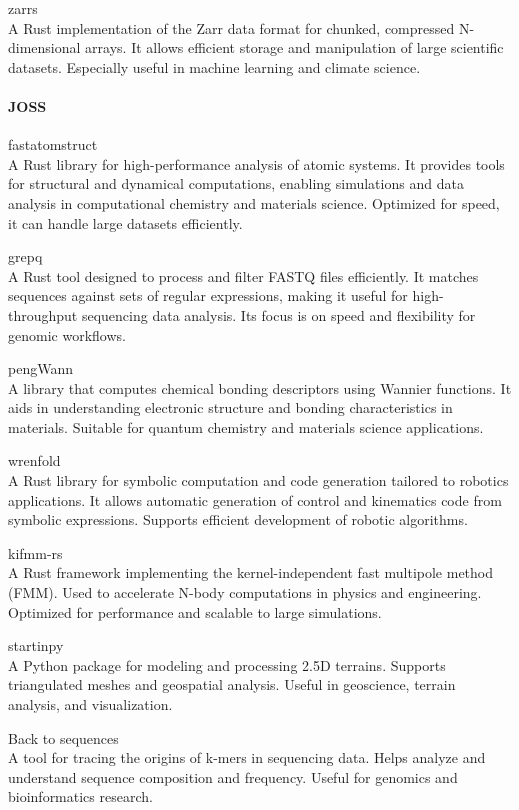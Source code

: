 \documentclass{article}
\begin{document}
zarrs\\
A Rust implementation of the Zarr data format for chunked, compressed N-dimensional arrays.
It allows efficient storage and manipulation of large scientific datasets. Especially useful in
machine learning and climate science.

\paragraph{JOSS}

fastatomstruct\\
A Rust library for high-performance analysis of atomic systems. It provides tools
for structural and dynamical computations, enabling simulations and data analysis in computational
chemistry and materials science. Optimized for speed, it can handle large datasets efficiently.

grepq\\
A Rust tool designed to process and filter FASTQ files efficiently. It matches sequences
against sets of regular expressions, making it useful for high-throughput sequencing data analysis.
Its focus is on speed and flexibility for genomic workflows.

pengWann\\
A library that computes chemical bonding descriptors using Wannier functions. It aids in
understanding electronic structure and bonding characteristics in materials. Suitable for quantum
chemistry and materials science applications.

wrenfold\\
A Rust library for symbolic computation and code generation tailored to robotics
applications. It allows automatic generation of control and kinematics code from symbolic
expressions. Supports efficient development of robotic algorithms.

kifmm-rs\\
A Rust framework implementing the kernel-independent fast multipole method (FMM). Used
to accelerate N-body computations in physics and engineering. Optimized for performance and
scalable to large simulations.

startinpy\\
A Python package for modeling and processing 2.5D terrains. Supports triangulated
meshes and geospatial analysis. Useful in geoscience, terrain analysis, and visualization.

Back to sequences\\
A tool for tracing the origins of k-mers in sequencing data. Helps analyze and
understand sequence composition and frequency. Useful for genomics and bioinformatics research.
\end{document}
